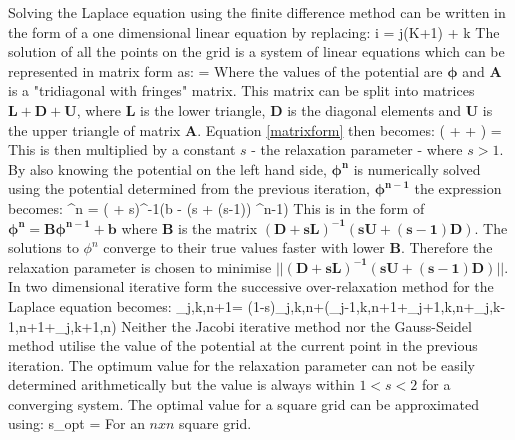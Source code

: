 Solving the Laplace equation using the finite difference method can be written in the form of a one dimensional linear equation by replacing:
\be
i = j(K+1) + k
\ee
The solution of all the points on the grid is a system of linear equations which can be represented in matrix form as:
\be
\label{matrixform}
 \cdot \boldsymbol{\phi} = 
\ee
Where the values of the potential are $\boldsymbol{\phi}$ and $\boldsymbol{A}$ is a "tridiagonal with fringes" matrix. This matrix can be split into matrices $\boldsymbol{L + D + U}$, where $\boldsymbol{L}$ is the lower triangle, $\boldsymbol{D}$ is the diagonal elements  and $\boldsymbol{U}$ is the upper triangle of matrix $\boldsymbol{A}$. Equation \ref{matrixform} then becomes:
\be
( +  + ) \cdot \boldsymbol{\phi} = 
\ee
This is then multiplied by a constant $s$ - the relaxation parameter - where $s > 1$. By also knowing  the potential on the left hand side, $\boldsymbol{\phi^{n}}$ is numerically solved using the potential determined from the previous iteration, $\boldsymbol{\phi^{n-1}}$ the expression becomes:
\be
\boldsymbol{\phi}^{n} = ( + s)^{-1}(b - (s + (s-1)) \cdot \boldsymbol{\phi}^{n-1})
\ee
This is in the form of $\boldsymbol{\phi^{n} = B\phi^{n-1} + b}$ where $\boldsymbol{B}$ is the matrix $\boldsymbol{(D + sL)^{-1}(sU + (s-1)D)}$. The solutions to $\phi^{n}$ converge to their true values faster with lower $\boldsymbol{B}$. Therefore the relaxation parameter is chosen to minimise $\boldsymbol{||(D + sL)^{-1}(sU + (s-1)D)}||$. In two dimensional iterative form the successive over-relaxation method for the Laplace equation becomes:
\be
\phi_{j,k,n+1}= (1-s)\phi_{j,k,n}+(\phi_{j-1,k,n+1}+\phi_{j+1,k,n}+\phi_{j,k-1,n+1}+\phi_{j,k+1,n})
\ee
Neither the Jacobi iterative method nor the Gauss-Seidel method utilise the value
of the potential at the current point in the previous iteration. The optimum value for the relaxation parameter can not be easily determined arithmetically but the value is always within $1<s<2$ for a converging system. The optimal value for a square grid can be approximated using:
 \be
 s_{opt} =  \approx {}
 \ee
For an $n x n$ square grid.
